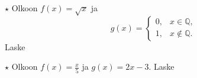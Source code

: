 \begin{tehtavasivu}
\begin{tehtava}$\star$ %
	Olkoon $f(x) =\sqrt{x} $ ja 
	\begin{equation*}
	g(x)=
		\begin{cases}
		  0, & x \in \mathbb{Q},\\
		  1, & x \notin \mathbb{Q}.
		\end{cases}
	\end{equation*}
	Laske
    \begin{vastaus}
    \end{vastaus}
\end{tehtava}

\begin{tehtava}$\star$
  Olkoon $f(x)=\frac{x}{5}$ ja $g(x)=2x-3$. Laske
  \begin{vastaus}
  \end{vastaus}
\end{tehtava}

\end{tehtavasivu}